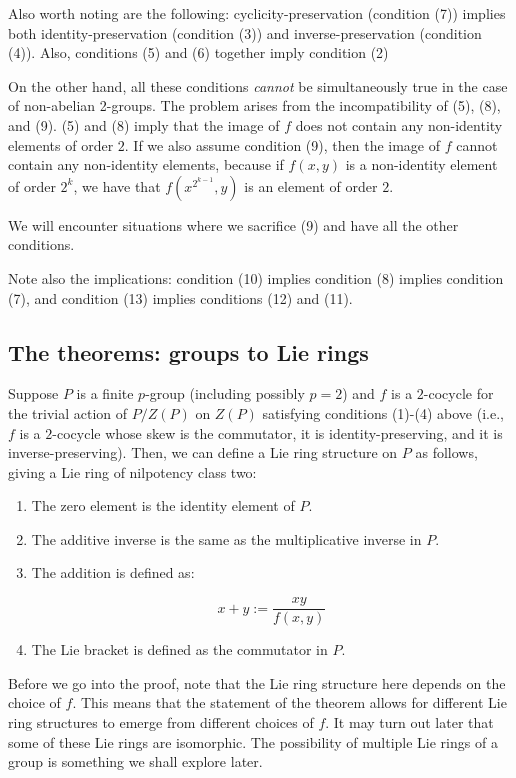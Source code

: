 \documentclass[10pt]{amsart}
\begin{document}
Also worth noting are the following: cyclicity-preservation (condition
(7)) implies both identity-preservation (condition (3)) and
inverse-preservation (condition (4)). Also, conditions (5) and (6)
together imply condition (2)

On the other hand, all these conditions {\em cannot} be simultaneously
true in the case of non-abelian 2-groups. The problem arises from the
incompatibility of (5), (8), and (9). (5) and (8) imply that the image
of $f$ does not contain any non-identity elements of order $2$. If we
also assume condition (9), then the image of $f$ cannot contain any
non-identity elements, because if $f(x,y)$ is a non-identity element
of order $2^k$, we have that $f(x^{2^{k-1}},y)$ is an element of order
$2$.

We will encounter situations where we sacrifice (9) and have all the
other conditions.

Note also the implications: condition (10) implies condition (8)
implies condition (7), and condition (13) implies conditions (12) and
(11).

\subsection{The theorems: groups to Lie rings}

\begin{theorem}\label{lazardgrouptoring1234}
  Suppose $P$ is a finite $p$-group (including possibly $p = 2$) and
  $f$ is a $2$-cocycle for the trivial action of $P/Z(P)$ on $Z(P)$
  satisfying conditions (1)-(4) above (i.e., $f$ is a $2$-cocycle
  whose skew is the commutator, it is identity-preserving, and it is
  inverse-preserving). Then, we can define a Lie ring structure on $P$
  as follows, giving a Lie ring of nilpotency class two:

  \begin{enumerate}
  \item The zero element is the identity element of $P$.
  \item The additive inverse is the same as the multiplicative inverse
    in $P$.
  \item The addition is defined as:

    $$x + y := \frac{xy}{f(x,y)}$$
  \item The Lie bracket is defined as the commutator in $P$.
  \end{enumerate}
\end{theorem}

Before we go into the proof, note that the Lie ring structure here
depends on the choice of $f$. This means that the statement of the
theorem allows for different Lie ring structures to emerge from
different choices of $f$. It may turn out later that some of these Lie
rings are isomorphic. The possibility of multiple Lie rings of a group
is something we shall explore later.
\end{document}
